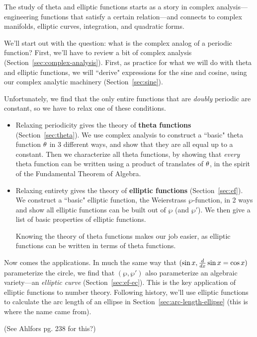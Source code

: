 \vskip0.15in

The study of theta and elliptic functions starts as a story in complex analysis---engineering functions that satisfy a certain relation---and connects to complex manifolds, elliptic curves, integration, and quadratic forms.

We'll start out with the question: what is the complex analog of a periodic function? First, we'll have to review a bit of complex analysis (Section~\ref{sec:complex-analysis}). First, as practice for what we will do with theta and elliptic functions, we will ``derive" expressions for the sine and cosine, using our complex analytic machinery (Section~\ref{sec:sine}).

Unfortunately, we find that the only entire functions that are {\it doubly} periodic are constant, so we have to relax one of these conditions.
\begin{itemize}
\item
Relaxing periodicity gives the theory of \textbf{theta functions} (Section~\ref{sec:theta}). We use complex analysis to construct a ``basic" theta function $\theta$ in 3 different ways, and show that they are all equal up to a constant. Then we characterize all theta functions, by showing that {\it every} theta function can be written using a product of translates of $\theta$, in the spirit of the Fundamental Theorem of Algebra.
\item
Relaxing entirety gives the theory of \textbf{elliptic functions} (Section~\ref{sec:ef}). We construct a ``basic" elliptic function, the Weierstrass $\wp$-function, in 2 ways and show all elliptic functions can be built out of $\wp$ (and $\wp'$). We then give a list of basic properties of elliptic functions.

Knowing the theory of theta functions makes our job easier, as elliptic functions can be written in terms of theta functions.
\end{itemize}

Now comes the applications. In much the same way that $(\sin x,\frac{d}{d x}\sin x=\cos x)$ parameterize the circle, we find that $(\wp,\wp')$ also parameterize an algebraic variety---an {\it elliptic curve} (Section~\ref{sec:ef-ec}). This is the key application of elliptic functions to number theory. 
Following history, we'll use elliptic functions to calculate the arc length of an ellipse in Section~\ref{sec:arc-length-ellipse} (this is where the name came from).

(See Ahlfors pg. 238 for this?)


